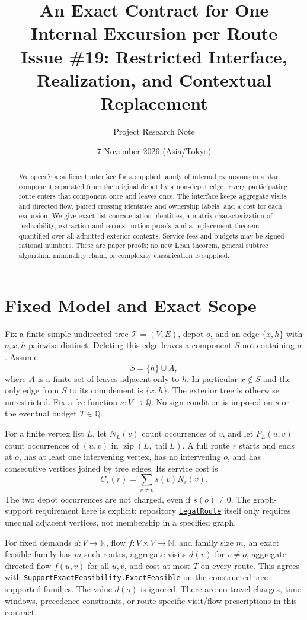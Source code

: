 \documentclass[11pt]{article}
\title{An Exact Contract for One Internal Excursion per Route\\
  \large Issue \#19: Restricted Interface, Realization, and Contextual Replacement}
\author{Project Research Note}
\date{7 November 2026 (Asia/Tokyo)}
\theoremstyle{remark}
\newcommand{\N}{\mathbb N}
\newcommand{\Q}{\mathbb Q}
\newcommand{\code}[1]{\nolinkurl{#1}}
\newcommand{\src}[2]{\href{https://github.com/huam54925-cpu/uav-routing-certification/blob/135cdef388c4d091aac78c9dd41cefddd57f202e/LeanCompletion/UAV/#1.lean}{#2}}
\begin{document}
\maketitle

\begin{abstract}
We specify a sufficient interface for a supplied family of internal excursions
in a star component separated from the original depot by a non-depot edge.
Every participating route enters that component once and leaves once.
The interface keeps aggregate visits and directed flow, paired crossing
identities and ownership labels, and a cost for each excursion. We give exact
list-concatenation identities, a matrix characterization of realizability,
extraction and reconstruction proofs, and a replacement theorem quantified over
all admitted exterior contexts. Service fees and budgets may be signed rational
numbers. These are paper proofs; no new Lean theorem, general subtree algorithm,
minimality claim, or complexity classification is supplied.
\end{abstract}

\section{Fixed Model and Exact Scope}
\label{sec:model}

Fix a finite simple undirected tree $\mathcal T=(V,E)$, depot $o$, and an edge
$\{x,h\}$ with $o,x,h$ pairwise distinct. Deleting this edge leaves a component
$S$ not containing $o$. Assume
\[
 S=\{h\}\mathbin{\dot\cup} A,
\]
where $A$ is a finite set of leaves adjacent only to $h$.
In particular $x\notin S$ and the only edge from $S$ to its complement is
$\{x,h\}$. The exterior tree is otherwise unrestricted.
Fix a fee function $s:V\to\Q$. No sign condition is imposed on $s$ or the
eventual budget $T\in\Q$.

For a finite vertex list $L$, let $N_L(v)$ count occurrences of $v$, and let
$F_L(u,v)$ count occurrences of $(u,v)$ in $\operatorname{zip}(L,\operatorname{tail}L)$.
A full route $r$ starts and ends at $o$, has at least one intervening vertex,
has no intervening $o$, and has consecutive vertices joined by tree edges.
Its service cost is
\[
 C_s(r)=\sum_{v\ne o}s(v)N_r(v).
\]
The two depot occurrences are not charged, even if $s(o)\ne0$.
The graph-support requirement here is explicit: repository
\src{RouteToFlow}{\code{LegalRoute}} itself only requires unequal adjacent
vertices, not membership in a specified graph.

For fixed demands $d:V\to\N$, flow $f:V\times V\to\N$, and family size $m$,
an exact feasible family has $m$ such routes, aggregate visits $d(v)$ for
$v\ne o$, aggregate directed flow $f(u,v)$ for all $u,v$, and cost at most $T$
on every route. This agrees with
\src{SupportExactFeasibility}{\code{SupportExactFeasibility.ExactFeasible}}
on the constructed tree-supported families. The value $d(o)$ is ignored.
There are no travel charges, time windows, precedence constraints, or
route-specific visit/flow prescriptions in this contract.
\end{document}
